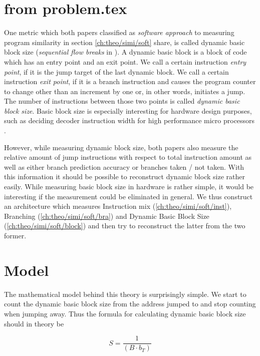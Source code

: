 \documentclass[../bachelor_paper.tex]{subfiles}
\begin{document}
\section{from problem.tex}

One metric which both papers \cite{phansalkarMeasuringProgramSimilarity2005,eeckhoutDesigningComputerArchitecture2003} classified as \emph{software approach} to measuring program similarity in section \ref{ch:theo/simi/soft} share, is called dynamic basic block size \cite{phansalkarMeasuringProgramSimilarity2005} (\emph{sequential flow breaks} in \cite{eeckhoutDesigningComputerArchitecture2003}). A dynamic basic block is a block of code which has an entry point and an exit point. We call a certain instruction \emph{entry point}, if it is the jump target of the last dynamic block. We call a certain instruction \emph{exit point}, if it is a branch instruction and causes the program counter to change other than an increment by one or, in other words, initiates a jump. The number of instructions between those two points is called \emph{dynamic basic block size}. Basic block size is especially interesting for hardware design purposes, such as deciding decoder instruction width for high performance micro processors \cite{johnsonSuperscalarMicroprocessorDesign1991}. 

However, while measuring dynamic block size, both papers also measure the relative amount of jump instructions with respect to total instruction amount as well as either branch prediction accuracy or branches taken / not taken. With this information it should be possible to reconstruct dynamic block size rather easily. While measuring basic block size in hardware is rather simple, it would be interesting if the measurement could be eliminated in general. We thus construct an architecture which measures Instruction mix (\ref{ch:theo/simi/soft/inst}), Branching (\ref{ch:theo/simi/soft/bra}) and Dynamic Basic Block Size (\ref{ch:theo/simi/soft/block}) and then try to reconstruct the latter from the two former.

\section{Model}
The mathematical model behind this theory is surprisingly simple. We start to count the dynamic basic block size from the address jumped to and stop counting when jumping away. Thus the formula for calculating dynamic basic block size should in theory be

\begin{equation}
S = \frac{1}{(B \cdot b_T)}
\end{equation}
\end{document}
